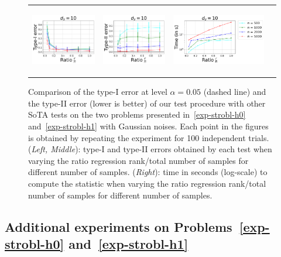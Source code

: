 \begin{figure}[ht]
\begin{tabular}{cccc} 
\includegraphics[height=3cm]{sections/appendix/independence_testing_kernel/figures_r_n/fig_ours_r_n_typeI.pdf}& \includegraphics[height=3cm]{sections/appendix/independence_testing_kernel/figures_r_n/fig_ours_r_n_typeII.pdf}&
\includegraphics[height=3cm]{sections/appendix/independence_testing_kernel/figures_r_n/fig_ours_r_n_time.pdf}\\
\end{tabular}
\caption{Comparison of the type-I error at level $\alpha=0.05$ (dashed line) and the type-II error (lower is better) of our test procedure with other SoTA tests on the two problems presented in~\eqref{exp-strobl-h0} and~\eqref{exp-strobl-h1}  with Gaussian noises. Each point in the figures is obtained by repeating the experiment for 100 independent trials. (\emph{Left, Middle}): type-I and type-II errors obtained by each test when varying the ratio regression rank/total number of samples for different number of samples. (\emph{Right}): time in seconds (log-scale) to compute the statistic  when varying the ratio regression rank/total number of samples for different number of samples.
\label{fig-rn-dependence}}
\vspace{-0.5cm}
\end{figure}





\newpage
\subsection{Additional experiments on Problems~\eqref{exp-strobl-h0} and~\eqref{exp-strobl-h1}}
\label{sec-exp-storbl}
\vspace{-0.2cm}
